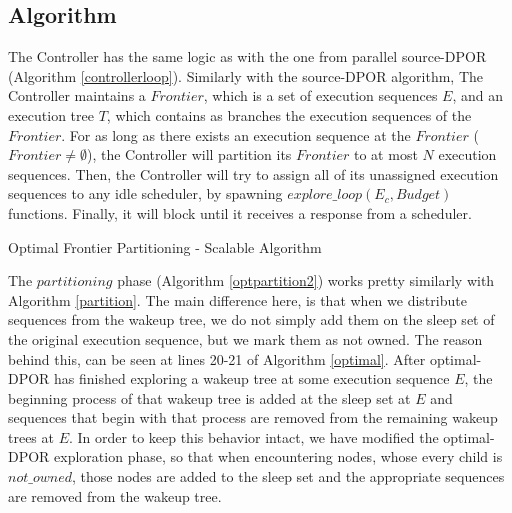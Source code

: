 \subsection{Algorithm}

The Controller has the same logic as with the one from parallel source-DPOR (Algorithm \ref{controllerloop}). Similarly with the source-DPOR algorithm, The Controller maintains a $Frontier$, 
which is a set of execution sequences $E$, and an execution tree $T$, which contains
as branches the execution sequences of the $Frontier$. For as long as there exists an execution sequence at the $Frontier$ 
($Frontier \neq \emptyset$), the Controller will partition its $Frontier$ to at most $N$ execution sequences. Then, the Controller
will try to assign all of its unassigned execution sequences to any idle scheduler, by spawning $explore\_loop(E_c, Budget)$
functions. Finally, it will block until it receives a response from a scheduler.

\begin{algorithm}
    \caption{Optimal Frontier Partitioning - Scalable Algorithm}
    \label{optpartition2}

\end{algorithm}

The $partitioning$ phase (Algorithm \ref{optpartition2}) works pretty similarly with Algorithm \ref{partition}. The main difference here, is that when we distribute sequences from the wakeup tree, we do not simply add them on the sleep set of the original execution sequence, but we mark them as not owned. The reason behind this, can be seen at lines 20-21 of Algorithm \ref{optimal}. After optimal-DPOR has finished exploring a wakeup tree at some execution sequence $E$,
the beginning process of that wakeup tree is added at the sleep set at $E$ and sequences that begin with that process are removed from the remaining wakeup trees at $E$. In order to keep this behavior intact, we have modified the optimal-DPOR exploration phase, so that when encountering nodes, whose every child is $not\_owned$, those nodes are added to the sleep set and the appropriate sequences are removed from the wakeup tree.

